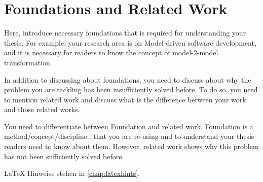 
\chapter{Foundations and Related Work}
\label{chap:ch2}

Here, introduce necessary foundations that is required for understanding your thesis. For example, your research area is on Model-driven software development, and it is necessary for readers to know the concept of model-2-model transformation.

In addition to discussing about foundations, you need to discuss about why the problem you are tackling has been insufficiently solved before. To do so, you need to mention related work and discuss what is the difference between your work and those related works.

You need to differentiate between Foundation and related work. Foundation is a method/concept/discipline.. that you are re-using and to understand your thesis readers need to know about them. However, related work shows why this problem has not been sufficiently solved before.

LaTeX-Hinweise stehen in \cref{chap:latexhints}.

